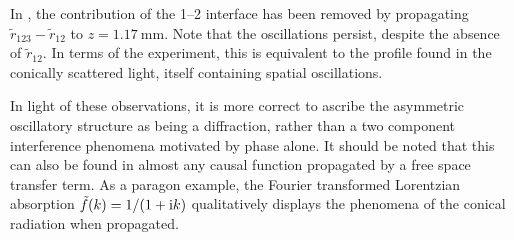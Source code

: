 In , the contribution of the 1--2 interface has been
removed by propagating $\tilde{r}_{123}-\tilde{r}_{12}$ to
$z=\SI{1.17}{\milli\meter}$.  Note that the oscillations persist, despite
the absence of $\tilde{r}_{12}$.  In terms of the experiment, this is
equivalent to the profile found in the conically scattered light, itself
containing spatial oscillations.

In light of these observations, it is more correct to ascribe the
asymmetric oscillatory structure as being a diffraction, rather than a two
component interference phenomena motivated by phase alone.  It should be
noted that this can also be found in almost any causal function propagated
by a free space transfer term. As a paragon example, the Fourier
transformed Lorentzian absorption $\tilde{f}(k) = 1/(1+{\mathrm{i}} k)$
qualitatively displays the phenomena of the conical radiation when
propagated.


